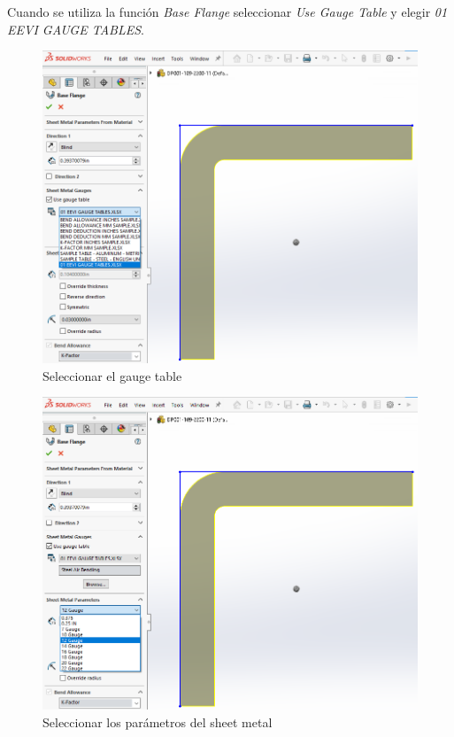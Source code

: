 \documentclass{report}
\begin{document}
Cuando se utiliza la función \emph{Base Flange} seleccionar \emph{Use Gauge Table} y elegir \emph{01 EEVI GAUGE TABLES}.

\begin{figure}[H]
	\centering
	\includegraphics[width=0.95\linewidth, height=0.5\textheight,keepaspectratio]{Imagenes/solidworks_sheetmetalgauge_04}
	\caption{Seleccionar el gauge table}
	\label{fig:solidworkssheetmetalgauge04}
\end{figure}

\begin{figure}[H]
	\centering
	\includegraphics[width=0.95\linewidth, height=0.5\textheight,keepaspectratio]{Imagenes/solidworks_sheetmetalgauge_05}
	\caption{Seleccionar los parámetros del sheet metal}
	\label{fig:solidworkssheetmetalgauge05}
\end{figure}
\end{document}
